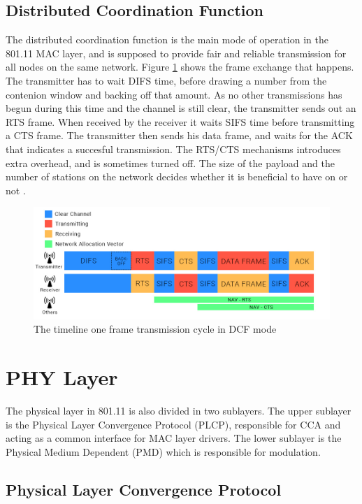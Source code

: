 \documentclass[a4paper,UKenglish]{report}
\begin{document}
\subsection{Distributed Coordination Function}
The distributed coordination function is the main mode of operation in the 801.11 MAC layer, and is supposed to provide fair and reliable 
transmission for all nodes on the same network. Figure \ref{fig:dcfmode} shows the 
frame exchange that happens. The transmitter has to wait DIFS time, before drawing 
a number from the contenion window and backing off that amount.
As no other transmissions has begun during this time and the channel is
still clear, the transmitter sends out an RTS frame. When received by the receiver
it waits SIFS time before transmitting a CTS frame. The transmitter then sends his
data frame, and waits for the ACK that indicates a succesful transmission. The 
RTS/CTS mechanisms introduces extra overhead, and is sometimes turned off. The
size of the payload and the number of stations on the network decides
whether it is beneficial to have on or not \cite{DCFanalysis}.



\begin{figure}
	\center
	\includegraphics[scale=0.35]{Images/DCF.jpg}
	\caption{The timeline one frame transmission cycle in DCF mode}
	\label{fig:dcfmode}
\end{figure}



\section{PHY Layer}
The physical layer in 801.11 is also divided in two sublayers. The upper sublayer is the Physical Layer Convergence Protocol (PLCP), responsible for CCA and acting
as a common interface for MAC layer drivers. The lower sublayer is the Physical Medium Dependent (PMD) which is responsible for modulation. 

\subsection{Physical Layer Convergence Protocol}
\end{document}
